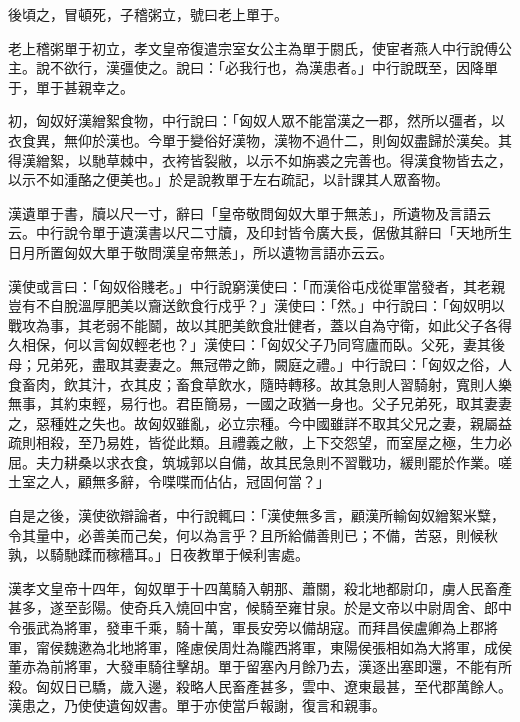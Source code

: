 \begin{pinyinscope}
後頃之，冒頓死，子稽粥立，號曰老上單于。

老上稽粥單于初立，孝文皇帝復遣宗室女公主為單于閼氏，使宦者燕人中行說傅公主。說不欲行，漢彊使之。說曰：「必我行也，為漢患者。」中行說既至，因降單于，單于甚親幸之。

初，匈奴好漢繒絮食物，中行說曰：「匈奴人眾不能當漢之一郡，然所以彊者，以衣食異，無仰於漢也。今單于變俗好漢物，漢物不過什二，則匈奴盡歸於漢矣。其得漢繒絮，以馳草棘中，衣袴皆裂敝，以示不如旃裘之完善也。得漢食物皆去之，以示不如湩酪之便美也。」於是說教單于左右疏記，以計課其人眾畜物。

漢遺單于書，牘以尺一寸，辭曰「皇帝敬問匈奴大單于無恙」，所遺物及言語云云。中行說令單于遺漢書以尺二寸牘，及印封皆令廣大長，倨傲其辭曰「天地所生日月所置匈奴大單于敬問漢皇帝無恙」，所以遺物言語亦云云。

漢使或言曰：「匈奴俗賤老。」中行說窮漢使曰：「而漢俗屯戍從軍當發者，其老親豈有不自脫溫厚肥美以齎送飲食行戍乎？」漢使曰：「然。」中行說曰：「匈奴明以戰攻為事，其老弱不能鬬，故以其肥美飲食壯健者，蓋以自為守衛，如此父子各得久相保，何以言匈奴輕老也？」漢使曰：「匈奴父子乃同穹廬而臥。父死，妻其後母；兄弟死，盡取其妻妻之。無冠帶之飾，闕庭之禮。」中行說曰：「匈奴之俗，人食畜肉，飲其汁，衣其皮；畜食草飲水，隨時轉移。故其急則人習騎射，寬則人樂無事，其約束輕，易行也。君臣簡易，一國之政猶一身也。父子兄弟死，取其妻妻之，惡種姓之失也。故匈奴雖亂，必立宗種。今中國雖詳不取其父兄之妻，親屬益疏則相殺，至乃易姓，皆從此類。且禮義之敝，上下交怨望，而室屋之極，生力必屈。夫力耕桑以求衣食，筑城郭以自備，故其民急則不習戰功，緩則罷於作業。嗟土室之人，顧無多辭，令喋喋而佔佔，冠固何當？」

自是之後，漢使欲辯論者，中行說輒曰：「漢使無多言，顧漢所輸匈奴繒絮米糱，令其量中，必善美而己矣，何以為言乎？且所給備善則已；不備，苦惡，則候秋孰，以騎馳蹂而稼穡耳。」日夜教單于候利害處。

漢孝文皇帝十四年，匈奴單于十四萬騎入朝那、蕭關，殺北地都尉卬，虜人民畜產甚多，遂至彭陽。使奇兵入燒回中宮，候騎至雍甘泉。於是文帝以中尉周舍、郎中令張武為將軍，發車千乘，騎十萬，軍長安旁以備胡寇。而拜昌侯盧卿為上郡將軍，甯侯魏遬為北地將軍，隆慮侯周灶為隴西將軍，東陽侯張相如為大將軍，成侯董赤為前將軍，大發車騎往擊胡。單于留塞內月餘乃去，漢逐出塞即還，不能有所殺。匈奴日已驕，歲入邊，殺略人民畜產甚多，雲中、遼東最甚，至代郡萬餘人。漢患之，乃使使遺匈奴書。單于亦使當戶報謝，復言和親事。


\end{pinyinscope}
